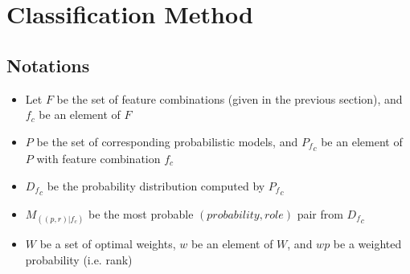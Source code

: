 \section{Classification Method}
\subsection{Notations}
\begin{itemize}
\item Let $F$ be the set of feature combinations (given in the previous section), and $f_c$ be an element of $F$
\item $P$ be the set of corresponding probabilistic models, and ${P_f}_c$ be an element of $P$ with feature combination $f_c$ 
\item ${D_f}_c$ be the probability distribution computed by ${P_f}_c$ 
\item $M_{((p,r)|f_c)}$ be the most probable $(probability,role)$ pair from  ${D_f}_c$
\item $W$ be a set of optimal weights, $w$ be an element of $W$, and $wp$ be a weighted probability (i.e. rank)
\end{itemize} 
